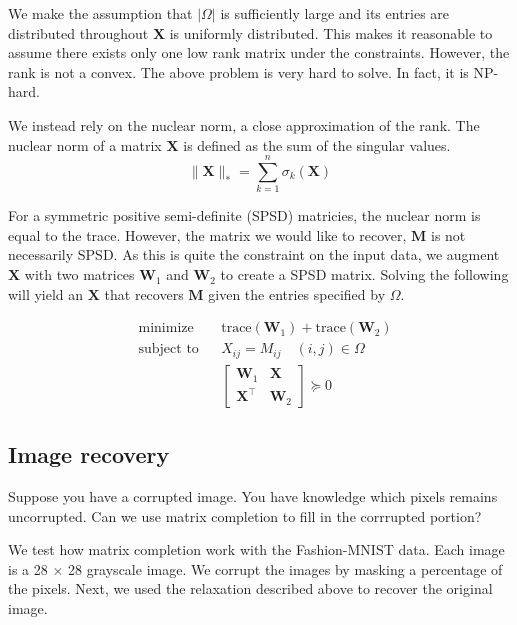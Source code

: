 \documentclass{article}
\begin{document}
We make the assumption that $|\Omega|$ is sufficiently large and its entries are distributed throughout 
$\mathbf{X}$ is uniformly distributed. 
This makes it reasonable to assume there exists only one low rank matrix under the constraints. 
However, the rank is not a convex. The above problem is very hard to solve. In fact, it is NP-hard. 

We instead rely on the nuclear norm, a close approximation of the rank. The nuclear norm of a matrix $\mathbf{X}$ is defined as the sum of 
the singular values.
\[
\lVert \mathbf{X} \rVert_* = \sum_{k=1}^n \sigma_k ({\mathbf{X}})  
\]

For a symmetric positive semi-definite (SPSD) matricies, the nuclear norm is equal to the trace. 
However, the matrix we would like to recover, $\mathbf{M}$ is not necessarily SPSD.
As this is quite the constraint on the input data, we augment $\mathbf{X}$ with two matrices 
$\mathbf{W}_1$ and $\mathbf{W}_2$ to create a SPSD matrix. Solving the following will yield an 
$\mathbf{X}$ that recovers $\mathbf{M}$ given the entries specified by $\Omega$.

\begin{equation*}
  \begin{aligned}
  & {\text{minimize}}
  & & \text{trace}(\mathbf{W}_1) + \text{trace}(\mathbf{W}_2) \\[1pt]
  & \text{subject to}
  & & X_{ij} = M_{ij} \quad (i,j) \in \Omega\\[1pt]
  &&& \begin{bmatrix} 
    \mathbf{W}_1 & \mathbf{X} \\
    \mathbf{X}^\top & \mathbf{W}_2
  \end{bmatrix} \succeq 0 
  \end{aligned}
\end{equation*}


\subsection{Image recovery}

Suppose you have a corrupted image. You have knowledge which pixels remains uncorrupted. Can we use matrix completion to
fill in the corrrupted portion? 

We test how matrix completion work with the Fashion-MNIST data. Each image is a 28 $\times$ 28 grayscale image. 
We corrupt the images by masking a percentage of the pixels. Next, we used the relaxation described above to 
recover the original image. 
\end{document}
